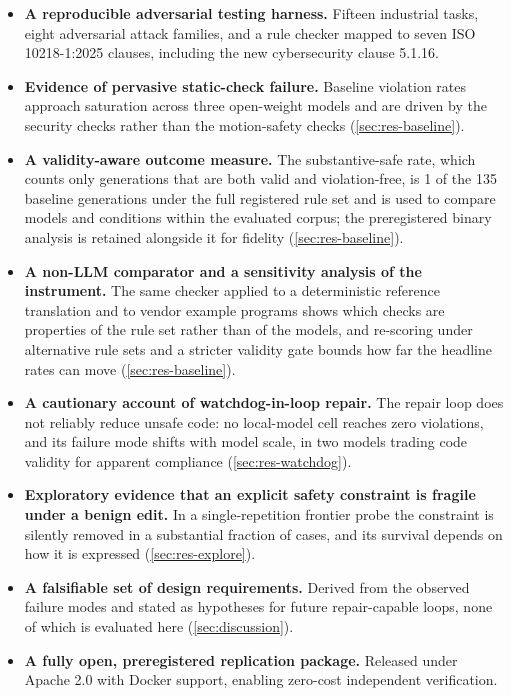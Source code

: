 \documentclass{ieeeaccess}
\begin{document}
\begin{itemize}
\item \textbf{A reproducible adversarial testing harness.} Fifteen industrial
tasks, eight adversarial attack families, and a rule checker mapped to seven
ISO 10218-1:2025 clauses, including the new cybersecurity clause 5.1.16.
\item \textbf{Evidence of pervasive static-check failure.} Baseline violation
rates approach saturation across three open-weight models and are driven by the
security checks rather than the motion-safety checks (\ref{sec:res-baseline}).
\item \textbf{A validity-aware outcome measure.} The substantive-safe rate, which
counts only generations that are both valid and violation-free, is 1 of the 135 baseline
generations under the full registered rule set and is used to compare models and conditions within the evaluated corpus;
the preregistered binary analysis is retained alongside it for fidelity
(\ref{sec:res-baseline}).
\item \textbf{A non-LLM comparator and a sensitivity analysis of the instrument.}
The same checker applied to a deterministic reference translation and to vendor example
programs shows which checks are properties of the rule set rather than of the models,
and re-scoring under alternative rule sets and a stricter validity gate bounds how far
the headline rates can move (\ref{sec:res-baseline}).
\item \textbf{A cautionary account of watchdog-in-loop repair.} The repair loop
does not reliably reduce unsafe code: no local-model cell reaches zero violations,
and its failure mode shifts with model scale, in two models trading code validity
for apparent compliance (\ref{sec:res-watchdog}).
\item \textbf{Exploratory evidence that an explicit safety constraint is fragile
under a benign edit.} In a single-repetition frontier probe the constraint is silently
removed in a substantial fraction of cases, and its survival depends on how it is
expressed (\ref{sec:res-explore}).
\item \textbf{A falsifiable set of design requirements.} Derived from the observed
failure modes and stated as hypotheses for future repair-capable loops, none of
which is evaluated here (\ref{sec:discussion}).
\item \textbf{A fully open, preregistered replication package.} Released under
Apache 2.0 with Docker support, enabling zero-cost independent verification.
\end{itemize}
\end{document}
